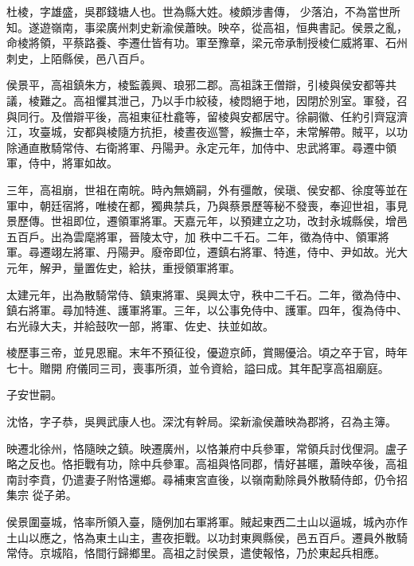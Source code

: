 \begin{pinyinscope}
 杜棱，字雄盛，吳郡錢塘人也。世為縣大姓。棱頗涉書傳，
 少落泊，不為當世所知。遂遊嶺南，事梁廣州刺史新渝侯蕭映。映卒，從高祖，恒典書記。侯景之亂，命棱將領，平蔡路養、李遷仕皆有功。軍至豫章，梁元帝承制授棱仁威將軍、石州刺史，上陌縣侯，邑八百戶。



 侯景平，高祖鎮朱方，棱監義興、琅邪二郡。高祖誅王僧辯，引棱與侯安都等共議，棱難之。高祖懼其泄己，乃以手巾絞稜，棱悶絕于地，因閉於別室。軍發，召與同行。及僧辯平後，高祖東征杜龕等，留棱與安都居守。徐嗣徽、任約引齊寇濟
 江，攻臺城，安都與棱隨方抗拒，棱晝夜巡警，綏撫士卒，未常解帶。賊平，以功除通直散騎常侍、右衛將軍、丹陽尹。永定元年，加侍中、忠武將軍。尋遷中領軍，侍中，將軍如故。



 三年，高祖崩，世祖在南皖。時內無嫡嗣，外有彊敵，侯瑱、侯安都、徐度等並在軍中，朝廷宿將，唯棱在都，獨典禁兵，乃與蔡景歷等秘不發喪，奉迎世祖，事見景歷傳。世祖即位，遷領軍將軍。天嘉元年，以預建立之功，改封永城縣侯，增邑五百戶。出為雲麾將軍，晉陵太守，加
 秩中二千石。二年，徵為侍中、領軍將軍。尋遷翊左將軍、丹陽尹。廢帝即位，遷鎮右將軍、特進，侍中、尹如故。光大元年，解尹，量置佐史，給扶，重授領軍將軍。



 太建元年，出為散騎常侍、鎮東將軍、吳興太守，秩中二千石。二年，徵為侍中、鎮右將軍。尋加特進、護軍將軍。三年，以公事免侍中、護軍。四年，復為侍中、右光祿大夫，并給鼓吹一部，將軍、佐史、扶並如故。



 棱歷事三帝，並見恩寵。末年不預征役，優遊京師，賞賜優洽。頃之卒于官，時年七十。贈開
 府儀同三司，喪事所須，並令資給，謚曰成。其年配享高祖廟庭。



 子安世嗣。



 沈恪，字子恭，吳興武康人也。深沈有幹局。梁新渝侯蕭映為郡將，召為主簿。



 映遷北徐州，恪隨映之鎮。映遷廣州，以恪兼府中兵參軍，常領兵討伐俚洞。盧子略之反也。恪拒戰有功，除中兵參軍。高祖與恪同郡，情好甚暱，蕭映卒後，高祖南討李賁，仍遣妻子附恪還鄉。尋補東宮直後，以嶺南勳除員外散騎侍郎，仍令招集宗
 從子弟。



 侯景圍臺城，恪率所領入臺，隨例加右軍將軍。賊起東西二土山以逼城，城內亦作土山以應之，恪為東土山主，晝夜拒戰。以功封東興縣侯，邑五百戶。遷員外散騎常侍。京城陷，恪間行歸鄉里。高祖之討侯景，遣使報恪，乃於東起兵相應。




\end{pinyinscope}
